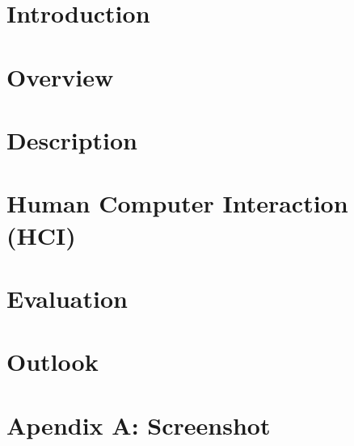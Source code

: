 \documentclass[a4paper]{article}
\begin{document}
	
	
	
	\clearpage
	
	\tableofcontents
	\clearpage
	
	\section{Introduction}
	
	
	\section{Overview}
	
		
	\section{Description}
	
		
	\section{Human Computer Interaction (HCI)}
	
		
	\section{Evaluation}
	
		
	\section{Outlook}
	
	
	\section{Apendix A: Screenshot}
	
	
	\clearpage
	{}
	
	
\end{document}
